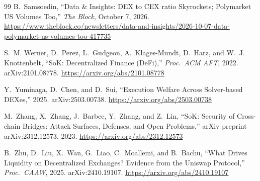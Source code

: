 {\begin{thebibliography}{99}
B.~Samsoedin,
``Data \& Insights: DEX to CEX ratio Skyrockets; Polymarket US Volumes Too,'' \emph{The Block}, October 7, 2026.
\url{https://www.theblock.co/newsletters/data-and-insights/2026-10-07-data-polymarket-us-volumes-too-417735}

S.~M. Werner, D.~Perez, L.~Gudgeon, A.~Klages-Mundt, D.~Harz, and W.~J. Knottenbelt,
``SoK: Decentralized Finance (DeFi),'' \emph{Proc.\ ACM AFT}, 2022. arXiv:2101.08778.
\url{https://arxiv.org/abs/2101.08778}

Y.~Yuminaga, D.~Chen, and D.~Sui,
``Execution Welfare Across Solver-based DEXes,'' 2025. arXiv:2503.00738.
\url{https://arxiv.org/abs/2503.00738}

M.~Zhang, X.~Zhang, J.~Barbee, Y.~Zhang, and Z.~Lin,
``SoK: Security of Cross-chain Bridges: Attack Surfaces, Defenses, and Open Problems,'' arXiv preprint arXiv:2312.12573, 2023.
\url{https://arxiv.org/abs/2312.12573}

B.~Zhu, D.~Liu, X.~Wan, G.~Liao, C.~Moallemi, and B.~Bachu,
``What Drives Liquidity on Decentralized Exchanges? Evidence from the Uniswap Protocol,'' \emph{Proc.\ CAAW}, 2025. arXiv:2410.19107.
\url{https://arxiv.org/abs/2410.19107}

\end{thebibliography}
}
